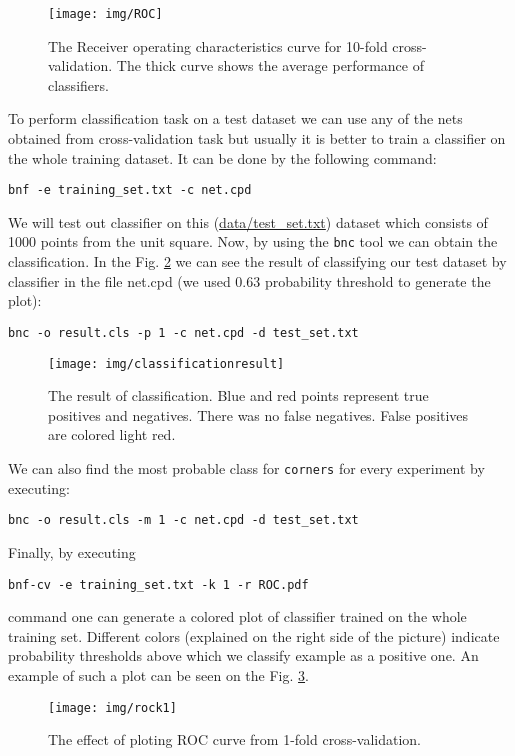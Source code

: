 \begin{figure}[h!]
  \centering
   \texttt{[image: img/ROC]}
  \caption{The Receiver operating characteristics curve for 10-fold cross-validation. The thick curve shows the average performance of classifiers. }
  \label{fig:ROC}
\end{figure}

To perform classification task on a test dataset we can use any of the nets obtained from cross-validation task but usually it is better to train a classifier on the whole training dataset. It can be done by the following command:
\begin{verbatim}
bnf -e training_set.txt -c net.cpd
\end{verbatim}

We will test out classifier on this (\url{data/test\_set.txt}) dataset which consists of 1000 points from the unit square. Now, by using the \texttt{bnc} tool we can obtain the classification. In the Fig. \ref{fig:classificationresult} we can see the result of classifying our test dataset by classifier in the file net.cpd (we used 0.63 probability threshold to generate the plot):
\begin{verbatim}
bnc -o result.cls -p 1 -c net.cpd -d test_set.txt
\end{verbatim}

\begin{figure}[h!]
  \centering
   \texttt{[image: img/classificationresult]}
  \caption{The result of classification. Blue and red points represent true positives and negatives. There was no false negatives. False positives are colored light red.}
  \label{fig:classificationresult}
\end{figure}

We can also find the most probable class for \texttt{corners} for every experiment by executing:
\begin{verbatim}
bnc -o result.cls -m 1 -c net.cpd -d test_set.txt
\end{verbatim}

Finally, by executing
\begin{verbatim}
bnf-cv -e training_set.txt -k 1 -r ROC.pdf
\end{verbatim}
command one can generate a colored plot of classifier trained on the whole training set. Different colors (explained on the right side of the picture) indicate probability thresholds above which we classify example as a positive one. An example of such a plot can be seen on the Fig. \ref{fig:rock1}.

\begin{figure}[h!]
  \centering
   \texttt{[image: img/rock1]}
  \caption{The effect of ploting ROC curve from 1-fold cross-validation.}
  \label{fig:rock1}
\end{figure}

